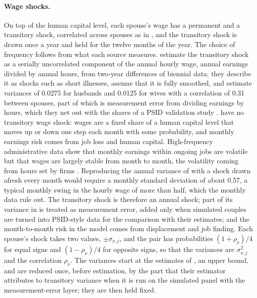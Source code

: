 \paragraph{Wage shocks.} On top of the human capital level, each spouse's wage has a permanent and a transitory
shock, correlated across spouses as in \citet{blundell2016consumption}, and the transitory shock is drawn once a year and
held for the twelve months of the year. The choice of frequency follows from what each source measures.
\citet{blundell2016consumption} estimate the transitory shock as a serially uncorrelated component of the annual hourly
wage, annual earnings divided by annual hours, from two-year differences of biennial data; they describe it as shocks
such as short illnesses, assume that it is fully smoothed, and estimate variances of 0.0275 for husbands and 0.0125 for
wives with a correlation of 0.31 between spouses, part of which is measurement error from dividing earnings by hours,
which they net out with the shares of a PSID validation study \citep{bound1994evidence}. \citet{bacher2025joint} have no
transitory wage shock: wages are a fixed share of a human capital level that moves up or down one step each month with
some probability, and monthly earnings risk comes from job loss and human capital. High-frequency administrative data
show that monthly earnings within ongoing jobs are volatile but that wages are largely stable from month to month, the
volatility coming from hours set by firms \citep{ganong2026earnings}. Reproducing the annual variance of
\citet{blundell2016consumption} with a shock drawn afresh every month would require a monthly standard deviation of about
0.57, a typical monthly swing in the hourly wage of more than half, which the monthly data rule out. The transitory shock
is therefore an annual shock; part of its variance in \citet{blundell2016consumption} is treated as measurement error,
added only when simulated couples are turned into PSID-style data for the comparison with their estimates; and the
month-to-month risk in the model comes from displacement and job finding. Each spouse's shock takes two values,
$\pm\sigma_{\nu,j}$, and the pair has probabilities $(1+\rho_\nu)/4$ for equal signs and $(1-\rho_\nu)/4$ for opposite
signs, so that the variances are $\sigma_{\nu,j}^2$ and the correlation $\rho_\nu$. The variances start at the
estimates of \citet{blundell2016consumption}, an upper bound, and are reduced once, before estimation, by the part that
their estimator attributes to transitory variance when it is run on the simulated panel with the measurement-error
layer; they are then held fixed.

